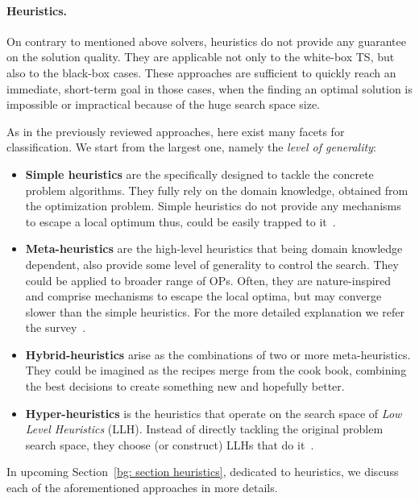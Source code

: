 \paragraph{Heuristics.} On contrary to mentioned above solvers, heuristics do not provide any guarantee on the solution quality. They are applicable not only to the white-box TS, but also to the black-box cases. These approaches are sufficient to quickly reach an immediate, short-term goal in those cases, when the finding an optimal solution is impossible or impractical because of the huge search space size.

As in the previously reviewed approaches, here exist many facets for classification.
We start from the largest one, namely the \textit{level of generality}:
\begin{itemize}[itemsep=8pt]
	\item \textbf{Simple heuristics} are the specifically designed to tackle the concrete problem algorithms. They fully rely on the domain knowledge, obtained from the optimization problem. Simple heuristics do not provide any mechanisms to escape a local optimum thus, could be easily trapped to it~\cite{pearl1984intelligent}.
	
	\item \textbf{Meta-heuristics} are the high-level heuristics that being domain knowledge dependent, also provide some level of generality to control the search. They could be applied to broader range of OPs. Often, they are nature-inspired and comprise mechanisms to escape the local optima, but may converge slower than the simple heuristics. For the more detailed explanation we refer the survey~\cite{bianchi2009survey}.
	
	\item \textbf{Hybrid-heuristics} arise as the combinations of two or more meta-heuristics. They could be imagined as the recipes merge from the cook book, combining the best decisions to create something new and hopefully better.
	
	\item \textbf{Hyper-heuristics} is the heuristics that operate on the search space of \emph{Low Level Heuristics} (LLH). Instead of directly tackling the original problem search space, they choose (or construct) LLHs that do it~\cite{burke2003hyper}. 
\end{itemize}

In upcoming Section~\ref{bg: section heuristics}, dedicated to heuristics, we discuss each of the aforementioned approaches in more details.


